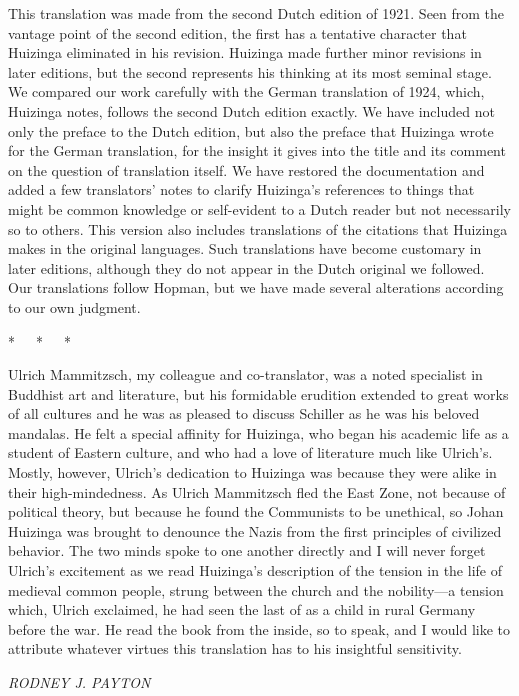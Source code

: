 This translation was made from the second Dutch edition of 1921. Seen
from the vantage point of the second edition, the first has a tentative
character that Huizinga eliminated in his revision. Huizinga made
further minor revisions in later editions, but the second represents his
thinking at its most seminal stage. We compared our work carefully with
the German translation of 1924, which, Huizinga notes, follows the
second Dutch edition exactly. We have included not only the preface to
the Dutch edition, but also the preface that Huizinga wrote for the
German translation, for the insight it gives into the title and its
comment on the question of translation itself. We have restored the
documentation and added a few translators' notes to clarify Huizinga's
references to things that might be common knowledge or self-evident to a
Dutch reader but not necessarily so to others. This version also
includes translations of the citations that Huizinga makes in the
original languages. Such translations have become customary in later
editions, although they do not appear in the Dutch original we followed.
Our translations follow Hopman, but we have made several alterations
according to our own judgment.

*~~~*~~~*

\protect\hypertarget{05_TRANSLATOR_S_INTRODUCTION.xhtmlux5cux23page_xviii}{}{}Ulrich
Mammitzsch, my colleague and co-translator, was a noted specialist in
Buddhist art and literature, but his formidable erudition extended to
great works of all cultures and he was as pleased to discuss Schiller as
he was his beloved mandalas. He felt a special affinity for Huizinga,
who began his academic life as a student of Eastern culture, and who had
a love of literature much like Ulrich's. Mostly, however, Ulrich's
dedication to Huizinga was because they were alike in their
high-mindedness. As Ulrich Mammitzsch fled the East Zone, not because of
political theory, but because he found the Communists to be unethical,
so Johan Huizinga was brought to denounce the Nazis from the first
principles of civilized behavior. The two minds spoke to one another
directly and I will never forget Ulrich's excitement as we read
Huizinga's description of the tension in the life of medieval common
people, strung between the church and the nobility---a tension which,
Ulrich exclaimed, he had seen the last of as a child in rural Germany
before the war. He read the book from the inside, so to speak, and I
would like to attribute whatever virtues this translation has to his
insightful sensitivity.

\emph{RODNEY J. PAYTON}

